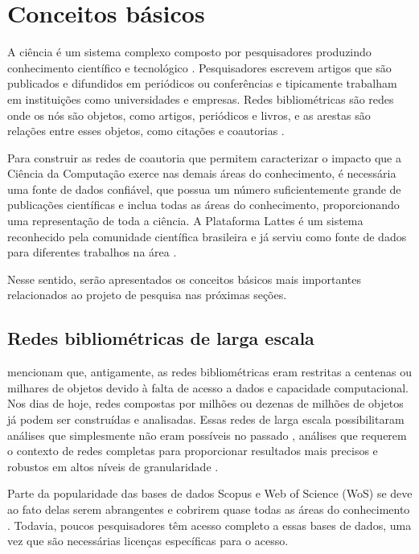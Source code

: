 \chapter[Conceitos básicos]{Conceitos básicos}

A ciência é um sistema complexo composto por pesquisadores produzindo conhecimento científico e tecnológico \cite{boyack2019creation}. Pesquisadores escrevem artigos que são publicados e difundidos em periódicos ou conferências e tipicamente trabalham em instituições como universidades e empresas. Redes bibliométricas são redes onde os nós são objetos, como artigos, periódicos e livros, e as arestas são relações entre esses objetos, como citações e coautorias \cite{glanzel2003bibliometrics}.

Para construir as redes de coautoria que permitem caracterizar o impacto que a Ciência da Computação exerce nas demais áreas do conhecimento, é necessária uma fonte de dados confiável, que possua um número suficientemente grande de publicações científicas e inclua todas as áreas do conhecimento, proporcionando uma representação de toda a ciência. A Plataforma Lattes é um sistema reconhecido pela comunidade científica brasileira e já serviu como fonte de dados para diferentes trabalhos na área \cite{alves2011sucupira, balancieri2005analise, dias2013modelagem, mena2013prospecccao}.

Nesse sentido, serão apresentados os conceitos básicos mais importantes relacionados ao projeto de pesquisa nas próximas seções.

\section{Redes bibliométricas de larga escala}

 mencionam que, antigamente, as redes bibliométricas eram restritas a centenas ou milhares de objetos devido à falta de acesso a dados e capacidade computacional. Nos dias de hoje, redes compostas por milhões ou dezenas de milhões de objetos já podem ser construídas e analisadas. Essas redes de larga escala possibilitaram análises que simplesmente não eram possíveis no passado \cite{newman2001scientific, shiffrin2004mapping}, análises que requerem o contexto de redes completas para proporcionar resultados mais precisos e robustos em altos níveis de granularidade \cite{boyack2019creation}.

Parte da popularidade das bases de dados Scopus e Web of Science (WoS) se deve ao fato delas serem abrangentes e cobrirem quase todas as áreas do conhecimento \cite{boyack2019creation}. Todavia, poucos pesquisadores têm acesso completo a essas bases de dados, uma vez que são necessárias licenças específicas para o acesso.

